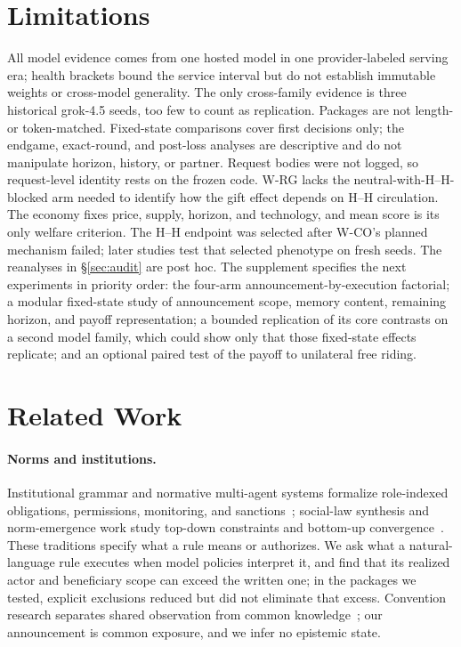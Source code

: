 \documentclass[sigconf,anonymous]{aamas}
\begin{document}
\section{Limitations}

All model evidence comes from one hosted model in one provider-labeled serving
era; health brackets bound the service interval but do not establish immutable
weights or cross-model generality.  The only cross-family evidence is three
historical grok-4.5 seeds, too few to count as replication.  Packages are not
length- or token-matched.  Fixed-state comparisons cover first decisions only;
the endgame, exact-round, and post-loss analyses are descriptive and do not
manipulate horizon, history, or partner.  Request bodies were not logged, so
request-level identity rests on the frozen code.  W-RG lacks the
neutral-with-H--H-blocked arm needed to identify how the gift effect depends on
H--H circulation.  The economy fixes price, supply, horizon, and technology,
and mean score is its only welfare criterion.  The H--H endpoint was selected
after W-CO's planned mechanism failed; later studies test that selected
phenotype on fresh seeds.  The reanalyses in \S\ref{sec:audit} are post hoc.
The supplement specifies the next experiments in priority order: the four-arm
announcement-by-execution factorial; a modular fixed-state study of announcement
scope, memory content, remaining horizon, and payoff representation; a bounded
replication of its core contrasts on a second model family, which could show
only that those fixed-state effects replicate; and an optional paired test of
the payoff to unilateral free riding.

\section{Related Work}

\paragraph{Norms and institutions.}  Institutional grammar and normative
multi-agent systems formalize role-indexed obligations, permissions, monitoring,
and sanctions~\cite{crawford1995,jones1996,boella2004,esteva2002,fornara2008,king2015};
social-law synthesis and norm-emergence work study top-down constraints and
bottom-up convergence~\cite{shoham1992,sen2007,savarimuthu2007,savarimuthu2011,morrismartin2019}.
These traditions specify what a rule means or authorizes.  We ask what a
natural-language rule executes when model policies interpret it, and find that its
realized actor and beneficiary scope can exceed the written one; in the packages
we tested, explicit exclusions reduced but did not eliminate that excess.  Convention research separates shared observation from common
knowledge~\cite{lewis1969,rubinstein1989,centola2015,centola2018}; our
announcement is common exposure, and we infer no epistemic state.
\end{document}
